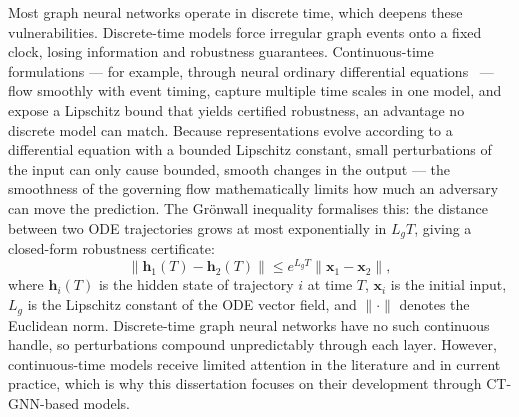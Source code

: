 Most graph neural networks operate in discrete time, which deepens these vulnerabilities. Discrete-time models force irregular graph events onto a fixed clock, losing information and robustness guarantees. Continuous-time formulations --- for example, through neural ordinary differential equations~\cite{Chen2018,Chamberlain2021,Rusch2022} --- flow smoothly with event timing, capture multiple time scales in one model, and expose a Lipschitz bound that yields certified robustness, an advantage no discrete model can match. Because representations evolve according to a differential equation with a bounded Lipschitz constant, small perturbations of the input can only cause bounded, smooth changes in the output --- the smoothness of the governing flow mathematically limits how much an adversary can move the prediction. The Gr\"{o}nwall inequality formalises this: the distance between two ODE trajectories grows at most exponentially in $L_g T$, giving a closed-form robustness certificate:
\begin{equation}
\|\mathbf{h}_1(T)-\mathbf{h}_2(T)\|\le e^{L_g T}\|\mathbf{x}_1-\mathbf{x}_2\|,
\label{eq:gronwall}
\end{equation}
where $\mathbf{h}_i(T)$ is the hidden state of trajectory $i$ at time $T$, $\mathbf{x}_i$ is the initial input, $L_g$ is the Lipschitz constant of the ODE vector field, and $\|\cdot\|$ denotes the Euclidean norm. Discrete-time graph neural networks have no such continuous handle, so perturbations compound unpredictably through each layer. However, continuous-time models receive limited attention in the literature and in current practice, which is why this dissertation focuses on their development through CT-GNN-based models.

